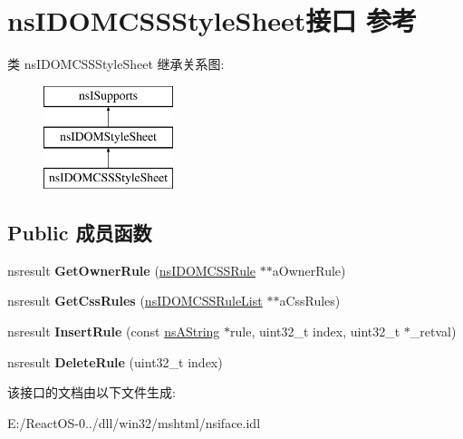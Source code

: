 \hypertarget{interfacens_i_d_o_m_c_s_s_style_sheet}{}\section{ns\+I\+D\+O\+M\+C\+S\+S\+Style\+Sheet接口 参考}
\label{interfacens_i_d_o_m_c_s_s_style_sheet}
类 ns\+I\+D\+O\+M\+C\+S\+S\+Style\+Sheet 继承关系图\+:\begin{figure}[H]
\begin{center}
\leavevmode
\includegraphics[height=3.000000cm]{interfacens_i_d_o_m_c_s_s_style_sheet}
\end{center}
\end{figure}
\subsection*{Public 成员函数}
\begin{DoxyCompactItemize}
\item 
\mbox{\label{interfacens_i_d_o_m_c_s_s_style_sheet_adb7a53ba109fdab87d2581f918bfa400}} 
nsresult {\bfseries Get\+Owner\+Rule} (\hyperlink{interfacens_i_d_o_m_c_s_s_rule}{ns\+I\+D\+O\+M\+C\+S\+S\+Rule} $\ast$$\ast$a\+Owner\+Rule)
\item 
\mbox{\label{interfacens_i_d_o_m_c_s_s_style_sheet_ac3fbfa78af954fa4796c6ab7a0ca9c36}} 
nsresult {\bfseries Get\+Css\+Rules} (\hyperlink{interfacens_i_d_o_m_c_s_s_rule_list}{ns\+I\+D\+O\+M\+C\+S\+S\+Rule\+List} $\ast$$\ast$a\+Css\+Rules)
\item 
\mbox{\label{interfacens_i_d_o_m_c_s_s_style_sheet_a59d6b2fe29eee726b16b008358c35c28}} 
nsresult {\bfseries Insert\+Rule} (const \hyperlink{structns_string_container}{ns\+A\+String} $\ast$rule, uint32\+\_\+t index, uint32\+\_\+t $\ast$\+\_\+retval)
\item 
\mbox{\label{interfacens_i_d_o_m_c_s_s_style_sheet_a27fa9764381072f5aeac32290c8396d3}} 
nsresult {\bfseries Delete\+Rule} (uint32\+\_\+t index)
\end{DoxyCompactItemize}


该接口的文档由以下文件生成\+:\begin{DoxyCompactItemize}
\item 
E\+:/\+React\+O\+S-\/0../dll/win32/mshtml/nsiface.\+idl\end{DoxyCompactItemize}
